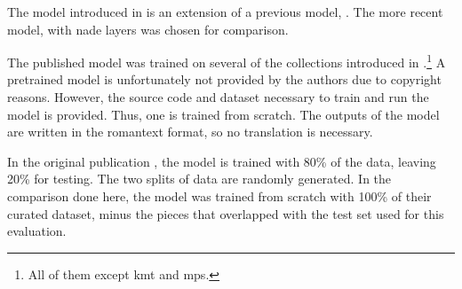 
The model introduced in \textcite{micchi2021deep} is an
extension of a previous model, \textcite{micchi2020not}. The
more recent model, with \gls{nade} layers was chosen for
comparison.

The published model was trained on several of the
collections introduced in
.\footnote{All of
them except \gls{kmt} and \gls{mps}.} A pretrained model is
unfortunately not provided by the authors due to copyright
reasons. However, the source code and dataset necessary to
train and run the model is provided. Thus, one is trained
from scratch. The outputs of the model are written in the
\gls{romantext} format, so no translation is necessary. 

In the original publication \parencite{micchi2021deep}, the
model is trained with 80\% of the data, leaving 20\% for
testing. The two splits of data are randomly generated. In
the comparison done here, the model was trained from scratch
with 100\% of their curated dataset, minus the pieces that
overlapped with the test set used for this evaluation.
